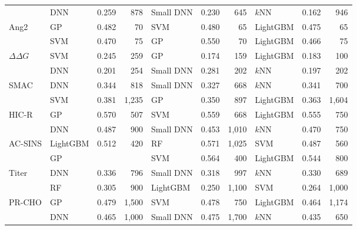 \begin{landscape}
\begin{longtable}{@{}llrrlrrlrr@{}}
 & DNN & 0.259 & 878 & Small DNN & 0.230 & 645 & $k$NN & 0.162 & 946 \\
Ang2 & GP & 0.482 & 70 & SVM & 0.480 & 65 & LightGBM & 0.475 & 65 \\
 & SVM & 0.470 & 75 & GP & 0.550 & 70 & LightGBM & 0.466 & 75 \\
$\Delta\Delta G$ & SVM & 0.245 & 259 & GP & 0.174 & 159 & LightGBM & 0.183 & 100 \\
 & DNN & 0.201 & 254 & Small DNN & 0.281 & 202 & $k$NN & 0.197 & 202 \\
SMAC & DNN & 0.344 & 818 & Small DNN & 0.327 & 668 & $k$NN & 0.341 & 700 \\
 & SVM & 0.381 & 1{,}235 & GP & 0.350 & 897 & LightGBM & 0.363 & 1{,}604 \\
HIC-R & GP & 0.570 & 507 & SVM & 0.559 & 668 & LightGBM & 0.555 & 750 \\
 & DNN & 0.487 & 900 & Small DNN & 0.453 & 1{,}010 & $k$NN & 0.470 & 750 \\
AC-SINS & LightGBM & 0.512 & 420 & RF & 0.571 & 1{,}025 & SVM & 0.487 & 560 \\
 & GP &  &  & SVM & 0.564 & 400 & LightGBM & 0.544 & 800 \\
Titer & DNN & 0.336 & 796 & Small DNN & 0.318 & 997 & $k$NN & 0.330 & 689 \\
 & RF & 0.305 & 900 & LightGBM & 0.250 & 1{,}100 & SVM & 0.264 & 1{,}000 \\
PR-CHO & GP & 0.479 & 1{,}500 & SVM & 0.478 & 750 & LightGBM & 0.464 & 1{,}174 \\
 & DNN & 0.465 & 1{,}000 & Small DNN & 0.475 & 1{,}700 & $k$NN & 0.435 & 650 \\
\end{longtable}
\end{landscape}

